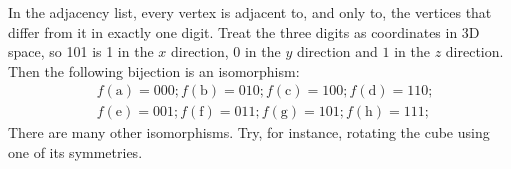 \begin{questions}
\begin{solution}
    In the adjacency list, every vertex is adjacent to, and only to, the vertices that differ from it in exactly one digit.
    Treat the three digits as coordinates in 3D space, so 101 is 1 in the $x$ direction, 0 in the $y$ direction and $1$ in the $z$ direction.
    Then the following bijection is an isomorphism:
    \begin{align*}
      &f(\textrm{a}) = 000; f(\textrm{b}) = 010; f(\textrm{c}) = 100; f(\textrm{d}) = 110; \\
      &f(\textrm{e}) = 001; f(\textrm{f}) = 011; f(\textrm{g}) = 101; f(\textrm{h}) = 111;
    \end{align*}
    There are many other isomorphisms.
    Try, for instance, rotating the cube using one of its symmetries.
\end{solution}




\end{questions}